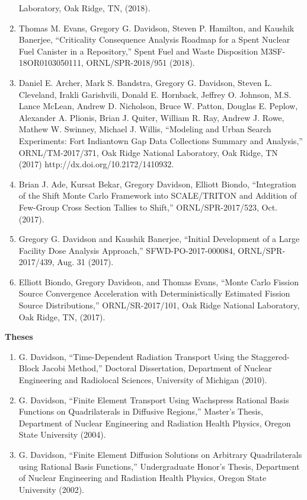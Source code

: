 \documentclass[letterpaper,11pt]{article}
\newcommand{\leftsubheading}[1]{
  \textbf{#1\vspace{-6pt} \\}}
\begin{document}
\begin{enumerate}
    Laboratory, Oak Ridge, TN, (2018).
  \item Thomas M. Evans, Gregory G. Davidson, Steven P. Hamilton,
    and Kaushik Banerjee, ``Criticality Consequence Analysis Roadmap
    for a Spent Nuclear Fuel Canister in a Repository,'' Spent Fuel
    and Waste Disposition M3SF-18OR0103050111, ORNL/SPR-2018/951
    (2018). 
  \item Daniel E. Archer, Mark S. Bandstra, Gregory G. Davidson,
    Steven L. Cleveland, Irakli Garishvili, Donald E. Hornback,
    Jeffrey O. Johnson, M.S. Lance McLean, Andrew D. Nicholson, Bruce
    W. Patton, Douglas E. Peplow, Alexander A. Plionis, Brian
    J. Quiter, William R. Ray, Andrew J. Rowe, Mathew W. Swinney,
    Michael J. Willis, ``Modeling and Urban Search Experiments: Fort
    Indiantown Gap Data Collections Summary and Analysis,''
    ORNL/TM-2017/371, Oak Ridge National Laboratory, Oak Ridge, TN
    (2017) http://dx.doi.org/10.2172/1410932.
  \item Brian J. Ade, Kursat Bekar, Gregory Davidson, Elliott
    Biondo, ``Integration of the Shift Monte Carlo Framework into
    SCALE/TRITON and Addition of Few-Group Cross Section Tallies to
    Shift,'' ORNL/SPR-2017/523, Oct. (2017).
  \item Gregory G. Davidson and Kaushik Banerjee, ``Initial
    Development of a Large Facility Dose Analysis Approach,''
    SFWD-PO-2017-000084, ORNL/SPR-2017/439, Aug. 31 (2017).
  \item Elliott Biondo, Gregory Davidson, and Thomas Evans, ``Monte
    Carlo Fission Source Convergence Acceleration with
    Deterministically Estimated Fission Source Distributions,''
    ORNL/SR-2017/101, Oak Ridge National Laboratory, Oak Ridge, TN,
    (2017).
\end{enumerate}


\leftsubheading{Theses}
\begin{enumerate}
  \item G. Davidson, ``Time-Dependent Radiation Transport Using the
    Staggered-Block Jacobi Method,'' Doctoral Dissertation, Department
    of Nuclear Engineering and Radiolocal Sciences, University of
    Michigan (2010).
  \item G. Davidson, ``Finite Element Transport Using Wachspress
    Rational Basis Functions on Quadrilaterals in Diffusive Regions,''
    Master's Thesis, Department of Nuclear Engineering and Radiation
    Health Physics, Oregon State University (2004).
  \item G. Davidson, ``Finite Element Diffusion Solutions on Arbitrary
    Quadrilaterals using Rational Basis Functions,'' Undergraduate
    Honor's Thesis, Department of Nuclear Engineering and Radiation
    Health Physics, Oregon State University (2002).
\end{enumerate}
\end{document}
